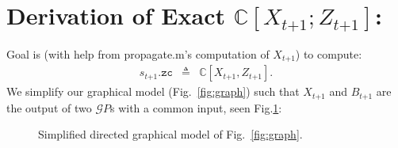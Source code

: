 \documentclass[9pt]{article}
\newcommand{\Cov}{{\mathbb C}}
\newcommand{\GP}{{\mathcal GP}}
\newcommand{\now}[1]{#1_t}                  %
\newcommand{\new}[1]{#1_{t\mathord{+}1}}    %
\newcommand{\uno}[1]{#1_{tt}}              %
\newcommand{\pne}[1]{#1_{t\mathord{+}1}}   %
\newcommand{\inv}{^{-1}}
\newcommand{\nn}{\nonumber}
\begin{document}
\section{Derivation of Exact $\Cov[\new{X};\pne{Z}]$:} \label{app:s.zc}

Goal is (with help from propagate.m's computation of $\new{X}$) to compute:
\begin{eqnarray}
\new{s}.\texttt{zc} &\triangleq& \Cov[\new{X},\pne{Z}]. \nn
\end{eqnarray}
%
We simplify our graphical model (Fig.~\ref{fig:graph}) such that $\new{X}$ and $\pne{B}$
are the output of two $\GP$s with a common input, seen Fig.\ref{fig:graph-szc}:
%
\begin{figure}[h]
\centering
{}
\caption{Simplified directed graphical model of Fig.~\ref{fig:graph}.}
\label{fig:graph-szc}
\end{figure}
\end{document}
